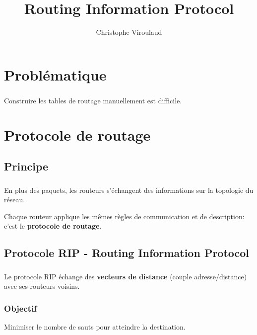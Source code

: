 \documentclass[svgnames,11pt]{beamer}
\author[]{Christophe Viroulaud}
\title{Routing Information Protocol}
\date{}
\institute{Terminale NSI}
\begin{document}
\section{Problématique}
\begin{frame}
    \frametitle{}
    Construire les tables de routage manuellement est difficile.
    \begin{center}
    \end{center}

\end{frame}

\section{Protocole de routage}
\subsection{Principe}

\begin{frame}
    \frametitle{}

    En plus des paquets, les routeurs s'échangent des informations sur la topologie du réseau.
    \begin{aretenir}[]
        Chaque routeur applique les mêmes règles de communication et de description: c'est le \textbf{protocole de routage}.
    \end{aretenir}

\end{frame}

\subsection{Protocole RIP - Routing Information Protocol}
\begin{frame}
    \frametitle{}

    \begin{aretenir}[]
        Le protocole RIP échange des \textbf{vecteurs de distance} (couple adresse/distance) avec ses routeurs voisins.
    \end{aretenir}
\end{frame}

\begin{frame}
    \frametitle{Objectif}

    Minimiser le nombre de sauts pour atteindre la destination.

\end{frame}
\end{document}

